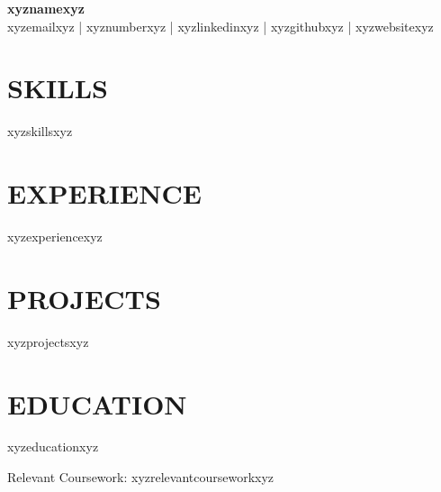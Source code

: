 \documentclass[a4paper,10pt]{article}
\begin{document}
\pagestyle{empty}

\begin{center}
\textbf{\Large xyznamexyz}\\[4pt]
xyzemailxyz | xyznumberxyz | xyzlinkedinxyz | xyzgithubxyz | xyzwebsitexyz
\end{center}

\vspace{4pt}

\section*{SKILLS}
\begin{itemize}
   xyzskillsxyz
\end{itemize}

\section*{EXPERIENCE}
xyzexperiencexyz

\section*{PROJECTS}
xyzprojectsxyz

\section*{EDUCATION}
\begin{itemize}
    xyzeducationxyz
\end{itemize}
Relevant Coursework: xyzrelevantcourseworkxyz
\end{document}
